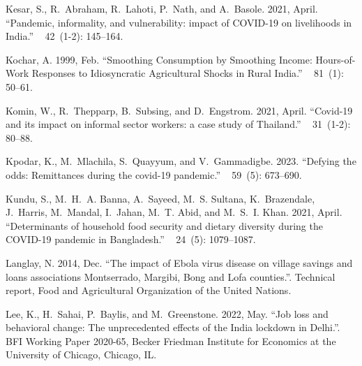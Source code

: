 \documentclass{wber}
\begin{document}
\begin{thebibliography}{}
Kesar, S., R.~Abraham, R.~Lahoti, P.~Nath, and A.~Basole. 2021, April.
\newblock ``Pandemic, informality, and vulnerability: impact of {COVID}-19 on
  livelihoods in {India}.''
~{ 42\/}~(1-2): 145--164.

Kochar, A. 1999, Feb.
\newblock ``{Smoothing Consumption by Smoothing Income: Hours-of-Work Responses
  to Idiosyncratic Agricultural Shocks in Rural India}.''
~{ 81\/}~(1): 50--61.

Komin, W., R.~Thepparp, B.~Subsing, and D.~Engstrom. 2021, April.
\newblock ``Covid-19 and its impact on informal sector workers: a case study of
  {Thailand}.''
~{
  31\/}~(1-2): 80--88.

Kpodar, K., M.~Mlachila, S.~Quayyum, and V.~Gammadigbe. 2023.
\newblock ``Defying the odds: Remittances during the covid-19 pandemic.''
~{ 59\/}~(5): 673--690.

Kundu, S., M.~H.~A. Banna, A.~Sayeed, M.~S. Sultana, K.~Brazendale, J.~Harris,
  M.~Mandal, I.~Jahan, M.~T. Abid, and M.~S.~I. Khan. 2021, April.
\newblock ``Determinants of household food security and dietary diversity
  during the {COVID}-19 pandemic in {Bangladesh}.''
~{ 24\/}~(5): 1079--1087.

Langlay, N. 2014, Dec.
\newblock ``The impact of {Ebola} virus disease on village savings and loans
  associations {Montserrado}, {Margibi}, {Bong} and {Lofa} counties.''.
\newblock Technical report, {Food and Agricultural Organization of the United
  Nations}.

Lee, K., H.~Sahai, P.~Baylis, and M.~Greenstone. 2022, May.
\newblock ``Job loss and behavioral change: The unprecedented effects of the
  {India} lockdown in {Delhi}.''.
\newblock BFI Working Paper 2020-65, Becker Friedman Institute for Economics at
  the University of Chicago, Chicago, IL.


\end{thebibliography}
\end{document}
